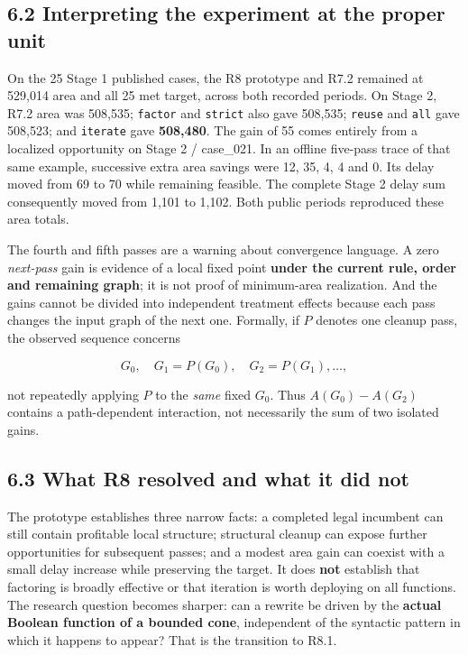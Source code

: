 \documentclass[a4paper,10pt]{article}
\theoremstyle{definition}
\theoremstyle{remark}
\begin{document}
\subsection{6.2 Interpreting the experiment at the proper unit}\label{interpreting-the-experiment-at-the-proper-unit}

On the 25 Stage 1 published cases, the R8 prototype and R7.2 remained at 529,014 area and all 25 met target, across both recorded periods. On Stage 2, R7.2 area was 508,535; \texttt{factor} and \texttt{strict} also gave 508,535; \texttt{reuse} and \texttt{all} gave 508,523; and \texttt{iterate} gave \textbf{508,480}. The gain of 55 comes entirely from a localized opportunity on Stage 2 / case\_021. In an offline five-pass trace of that same example, successive extra area savings were 12, 35, 4, 4 and 0. Its delay moved from 69 to 70 while remaining feasible. The complete Stage 2 delay sum consequently moved from 1,101 to 1,102. Both public periods reproduced these area totals.

The fourth and fifth passes are a warning about convergence language. A zero \emph{next-pass} gain is evidence of a local fixed point \textbf{under the current rule, order and remaining graph}; it is not proof of minimum-area realization. And the gains cannot be divided into independent treatment effects because each pass changes the input graph of the next one. Formally, if \(P\) denotes one cleanup pass, the observed sequence concerns

\[
G_0,\quad G_1=P(G_0),\quad G_2=P(G_1),\ldots,
\]

not repeatedly applying \(P\) to the \emph{same} fixed \(G_0\). Thus \(A(G_0)-A(G_2)\) contains a path-dependent interaction, not necessarily the sum of two isolated gains.

\subsection{6.3 What R8 resolved and what it did not}\label{what-r8-resolved-and-what-it-did-not}

The prototype establishes three narrow facts: a completed legal incumbent can still contain profitable local structure; structural cleanup can expose further opportunities for subsequent passes; and a modest area gain can coexist with a small delay increase while preserving the target. It does \textbf{not} establish that factoring is broadly effective or that iteration is worth deploying on all functions. The research question becomes sharper: can a rewrite be driven by the \textbf{actual Boolean function of a bounded cone}, independent of the syntactic pattern in which it happens to appear? That is the transition to R8.1.
\end{document}
